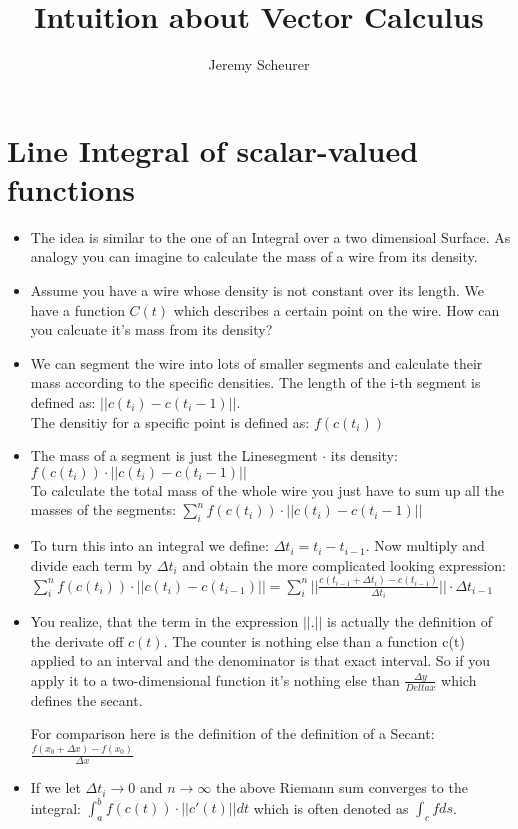 \documentclass[12pt,a4paper]{article}
\author{Jeremy Scheurer}
\title{Intuition about Vector Calculus}
\begin{document}
	\section{Line Integral of scalar-valued functions}
	
	\begin{itemize}
	
	\item The idea is similar to the one of an Integral over a two dimensioal Surface. As analogy you can imagine to calculate the mass of a wire from its density. 
	
	\item Assume you have a wire whose density is not constant over its length. We have a function $C(t)$ which describes a certain point on the wire. How can you calcuate it's mass from its density?
	
	\item We can segment the wire into lots of smaller segments and calculate their mass according to the specific densities. The length of the i-th segment is defined as: $||c(t_i) - c(t_i -1)||$. \\
	The densitiy for a specific point is defined as: $f(c(t_i))$
	
	\item The mass of a segment is just the Linesegment $\cdot$ its density: \\
	$f(c(t_i))\cdot||c(t_i) - c(t_i -1)||$ \\
	To calculate the total mass of the whole wire you just have to sum up all the masses of the segments: $\sum_{i}^{n} f(c(t_i))\cdot||c(t_i) - c(t_i -1)||$
	
	\item To turn this into an integral we define: $ \Delta t_i = t_i - t_{i-1}$. Now multiply and divide each term by $\Delta t_i$ and obtain the more complicated looking expression: \\
	$\sum_{i}^{n} f(c(t_i))\cdot ||c(t_i)-c(t_{i-1})|| = \sum_{i}^{n}     ||\frac{c(t_{i-1} + \Delta t_i)-c(t_{i-1})}{\Delta t_i}|| \cdot \Delta t_{i-1}$
	
	\item You realize, that the term in the expression $||.||$ is actually the definition of the derivate off $c(t)$. The counter is nothing else than a function c(t) applied to an interval and the denominator is that exact interval. So if you apply it to a two-dimensional function it's nothing else than $\frac{\Delta y}{Delta x}$ which defines the secant. 
	
	For comparison here is the definition of the definition of a Secant: \\
	$\frac{f(x_0 + \Delta x) - f(x_0)}{\Delta x}$


	\item If we let $\Delta t_i \rightarrow 0$ and $n \rightarrow \infty $ the above Riemann sum converges to the integral:
	$\int_{a}^{b} f(c(t))\cdot ||c'(t)|| dt$ which is often denoted as $\int_{c}^{}f ds$.
	\end{itemize}
	
\end{document}
